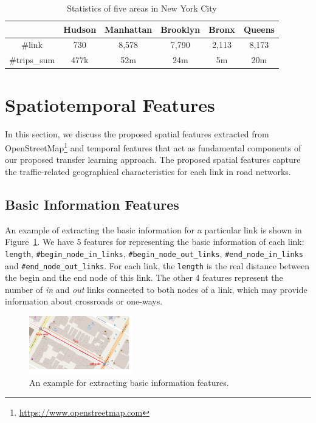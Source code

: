 \documentclass[letterpaper]{article} %
\begin{document}
\begin{table}[t]
	\centering
	\small
	\caption{Statistics of five areas in New York City}
	\label{tab:regions}
	\begin{tabular}{|c|c|c|c|c|c|}
		\cline{1-6}
		~& {Hudson}  & {Manhattan}  & {Brooklyn}  & {Bronx}    & {Queens}    \\ \hline
		\#link           & 730     & 8,578       & 7,790      & 2,113     & 8,173      \\ \hline
		\#trips\_sum & 477k  & 52m  & 24m & 5m  & 20m  \\ \hline
	\end{tabular}
\end{table}



\section{Spatiotemporal Features}
In this section, we discuss the proposed spatial features extracted from OpenStreetMap\footnote{\url{https://www.openstreetmap.com}} and temporal features that act as fundamental components of our proposed transfer learning approach. 
The proposed spatial features capture the traffic-related geographical characteristics for each link in road networks.

\subsection{Basic Information Features} 
An example of extracting the basic information for a particular link is shown in Figure~\ref{fig:basic}.
We have 5 features for representing the basic information of each link: 
\texttt{length}, \texttt{\#begin\_node\_in\_links}, \texttt{\#begin\_node\_out\_links}, \texttt{\#end\_node\_in\_links} and \texttt{\#end\_node\_out\_links}.
For each link, the \texttt{length} is the real distance between the begin and the end node of this link. 
The other 4 features represent the number of \textit{in} and \textit{out} links connected to both nodes of a link, which may provide information about crossroads or one-ways.

\begin{figure}[th]
	\centering
	\includegraphics[width=0.4\textwidth]{figures/basic.pdf}
	\caption{An example for extracting basic information features.}
	\label{fig:basic}
\end{figure}
\end{document}
